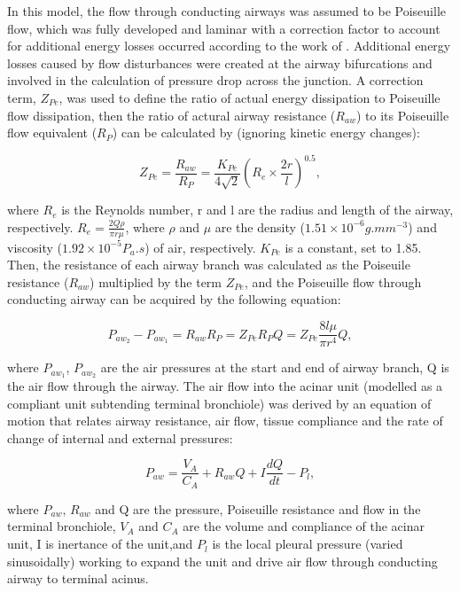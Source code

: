 In this model, the flow through conducting airways was assumed to be Poiseuille flow, which was fully developed and laminar with a correction factor to account for additional energy losses occurred according to the work of \cite{pedley1970energy}. Additional energy losses caused by flow disturbances were created at the airway bifurcations and involved in the calculation of pressure drop across the junction. A correction term, $Z_{Pe}$, was used to define the ratio of actual energy dissipation to Poiseuille flow dissipation, then the ratio of actural airway resistance ($R_{aw}$) to its Poiseuille flow equivalent ($R_P$) can be calculated by (ignoring kinetic energy changes):

\begin{equation}
 \label{eq:EnergyDissipation}
 Z_{Pe} = \frac{R_{aw}}{R_P} = \frac{K_{Pe}}{4\sqrt{2}}(R_e \times \frac{2r}{l})^{0.5},
\end{equation}

\noindent where $R_e$ is the Reynolds number, r and l are the radius and length of the airway, respectively. $R_e = \frac{2Q\rho}{\pi r \mu}$, where $\rho$ and $\mu$ are the density ($1.51 \times 10^{-6}g.mm^{-3}$) and viscosity ($1.92 \times 10^{-5}P_{a}.s$) of air, respectively. $K_{Pe}$ is a constant, set to 1.85. Then, the resistance of each airway branch was calculated as the Poiseuile resistance ($R_{aw}$) multiplied by the term $Z_{Pe}$, and the Poiseuille flow through conducting airway can be acquired by the following equation:

\begin{equation}
 \label{eq:PressureFlowEquation}
 P_{aw_2} - P_{aw_1} = R_{aw}R_P = Z_{Pe}R_PQ = Z_{Pe}\frac{8l\mu}{\pi r^{4}}Q,
\end{equation}

\noindent where $P_{aw_1}$, $P_{aw_2}$ are the air pressures at the start and end of airway branch, Q is the air flow through the airway. The air flow into the acinar unit (modelled as a compliant unit subtending terminal bronchiole) was derived by an equation of motion that relates airway resistance, air flow, tissue compliance and the rate of change of internal and external pressures:

\begin{equation}
 \label{eq:AcinarFlowEquation}
 P_{aw} = \frac{V_A}{C_A} + R_{aw}Q + I\frac{dQ}{dt} - P_l,
\end{equation}

\noindent where $P_{aw}$, $R_{aw}$ and Q are the pressure, Poiseuille resistance and flow in the terminal bronchiole, $V_A$ and $C_A$ are the volume and compliance of the acinar unit, I is inertance of the unit,and $P_l$ is the local pleural pressure (varied sinusoidally) working to expand the unit and drive air flow through conducting airway to terminal acinus.

